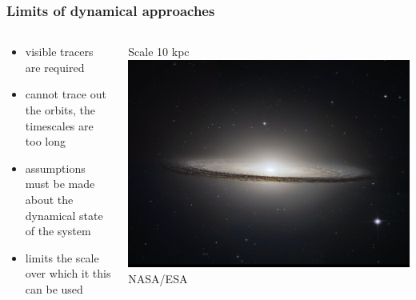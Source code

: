 \documentclass{beamer}
\begin{document}
\frame
{
    \frametitle{Limits of dynamical approaches}

    \begin{columns}
        \begin{column}{0.5\textwidth}    
            \begin{itemize}

                \item visible tracers are required
                \item cannot trace out the orbits, the timescales are too long
                \item assumptions must be made about the dynamical state of the system
                \item limits the scale over which it this can be used

            \end{itemize}
        \end{column}
        \begin{column}{0.5\textwidth}
            \begin{center}
                {\small Scale 10 kpc}
                \includegraphics[width=\textwidth]{m104-2013-03-01-HLA-5238-HLA-crop.jpg}
                \newline
                {\tiny NASA/ESA}
            \end{center}
        \end{column}
    \end{columns}
}
\end{document}
